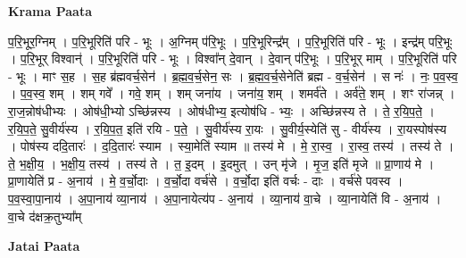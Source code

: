 \documentclass[17pt]{extarticle}
\begin{document}
\textbf{Krama Paata} \newline

प॒रि॒भूर॒ग्निम् । प॒रि॒भूरिति॑ परि - भूः । अ॒ग्निम् प॑रि॒भूः । प॒रि॒भूरिन्द्र᳚म् । प॒रि॒भूरिति॑ परि - भूः । इन्द्र॑म् परि॒भूः । प॒रि॒भूर् विश्वान्॑ । प॒रि॒भूरिति॑ परि - भूः । विश्वा᳚न् दे॒वान् । दे॒वान् प॑रि॒भूः । 
प॒रि॒भूर् माम् । प॒रि॒भूरिति॑ परि - भूः । माꣳ स॒ह । स॒ह ब्र॑ह्मवर्च॒सेन॑ । ब्र॒ह्म॒व॒र्च॒सेन॒ सः । ब्र॒ह्म॒व॒र्च॒सेनेति॑ ब्रह्म - व॒र्च॒सेन॑ । स नः॑ । नः॒ प॒व॒स्व॒ । प॒व॒स्व॒ शम् । शम् गवे᳚ । गवे॒ शम् । शम् जना॑य । जना॑य॒ शम् । शमर्व॑ते । अर्व॑ते॒ शम् । शꣳ रा॑जन्न् । रा॒ज॒न्नोष॑धीभ्यः । ओष॑धी॒भ्यो ऽच्छि॑न्नस्य । ओष॑धीभ्य॒ इत्योष॑धि - भ्यः॒ । अच्छि॑न्नस्य ते । ते॒ र॒यि॒प॒ते॒ । र॒यि॒प॒ते॒ सु॒वीर्य॑स्य । र॒यि॒प॒त॒ इति॑ रयि - प॒ते॒ । सु॒वीर्य॑स्य रा॒यः । सु॒वीर्य॒स्येति॑ सु - वीर्य॑स्य । रा॒यस्पोष॑स्य । पोष॑स्य ददि॒तारः॑ । द॒दि॒तारः॑ स्याम । स्या॒मेति॑ स्याम ॥ तस्य॑ मे । मे॒ रा॒स्व॒ । रा॒स्व॒ तस्य॑ । तस्य॑ ते । ते॒ भ॒क्षी॒य॒ । भ॒क्षी॒य॒ तस्य॑ । तस्य॑ ते । त॒ इ॒दम् । इ॒दमुत् । उन् मृ॑जे । मृ॒ज॒ इति॑ मृजे ॥ प्रा॒णाय॑ मे । प्रा॒णायेति॑ प्र - अ॒नाय॑ । मे॒ व॒र्चो॒दाः । व॒र्चो॒दा वर्च॑से । व॒र्चो॒दा इति॑ वर्चः - दाः । वर्च॑से पवस्व । प॒व॒स्वा॒पा॒नाय॑ । अ॒पा॒नाय॑ व्या॒नाय॑ । अ॒पा॒नायेत्य॑प - अ॒नाय॑ । व्या॒नाय॑ वा॒चे । व्या॒नायेति॑ वि - अ॒नाय॑ । वा॒चे द॑क्षक्र॒तुभ्या᳚म् \newline

\textbf{Jatai Paata} \newline
\end{document}

